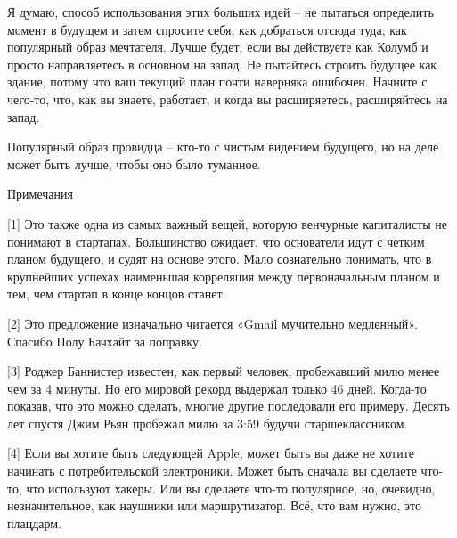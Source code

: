 \documentclass[ebook,12pt,oneside,openany]{memoir}
\begin{document}
Я думаю, способ использования этих больших идей – не пытаться
определить момент в будущем и затем спросите себя, как добраться
отсюда туда, как популярный образ мечтателя. Лучше будет, если вы
действуете как Колумб и просто направляетесь в основном на запад. Не
пытайтесь строить будущее как здание, потому что ваш текущий план
почти наверняка ошибочен. Начните с чего-то, что, как вы знаете,
работает, и когда вы расширяетесь, расширяйтесь на запад.

Популярный образ провидца – кто-то с чистым видением будущего, но на
деле может быть лучше, чтобы оно было туманное.

Примечания

[1] Это также одна из самых важный вещей, которую венчурные
капиталисты не понимают в стартапах. Большинство ожидает, что
основатели идут с четким планом будущего, и судят на основе этого.
Мало сознательно понимать, что в крупнейших успехах наименьшая
корреляция между первоначальным планом и тем, чем стартап в конце
концов станет.

[2] Это предложение изначально читается «Gmail мучительно медленный».
Спасибо Полу Бачхайт за поправку.

[3] Роджер Баннистер известен, как первый человек, пробежавший милю
менее чем за 4 минуты. Но его мировой рекорд выдержал только 46 дней.
Когда-то показав, что это можно сделать, многие другие последовали его
примеру. Десять лет спустя Джим Рьян пробежал милю за 3:59 будучи
старшеклассником.

[4] Если вы хотите быть следующей Apple, может быть вы даже не хотите
начинать с потребительской электроники. Может быть сначала вы сделаете
что-то, что используют хакеры. Или вы сделаете что-то популярное, но,
очевидно, незначительное, как наушники или маршрутизатор. Всё, что вам
нужно, это плацдарм.
\end{document}
